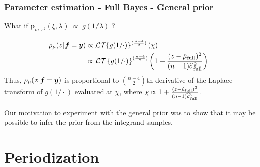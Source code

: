 \documentclass[handout, 10pt,compress,xcolor={usenames,dvipsnames}]{beamer} %
\newcommand{\bm}[1]{\boldsymbol{#1}}
\newcommand{\vrho}{\bm{\rho}}
\begin{document}
\begin{frame}
	\frametitle{Parameter estimation - Full Bayes - General prior}
	\vspace*{-6ex}
	What if $\vrho_{m,s^2}(\xi, \lambda) \; \propto \; g( 1/\lambda )$ ?
	
	\begin{align*}
	{\rho_{\mu}(z | \vf = \vy)} & \propto \mathcal{LT} \{ g(1/\cdot) \}^{(\frac{n-4}2)} \left(\chi \right) \\
	& \propto
	\mathcal{LT} \left\{ g({1}/{\cdot})
	\right\}^{(\frac{n-4}2)} \left( 1 +  \frac{(z - \hmu_{\textup{full}})^2}{(n-1)\widehat{\sigma}_{\textup{full}}^2}\right) \quad %
	\end{align*}
	Thus, $\rho_{\mu}(z | \boldsymbol{f} = \boldsymbol{y})$  is proportional to $\left(\frac{n-4}{2}\right)$th derivative of the Laplace transform of $g(1/\cdot)$ evaluated at $\chi$, where $\chi \propto { 1 +  \frac{(z - \hat{\mu}_{\textup{full}})^2}{(n-1)\widehat{\sigma}_{\textup{full}}^2} } $.
	
	Our motivation to experiment with the general prior was to show that it may
	be possible to infer the prior from the integrand samples.
\end{frame}






\section{Periodization}
\end{document}
